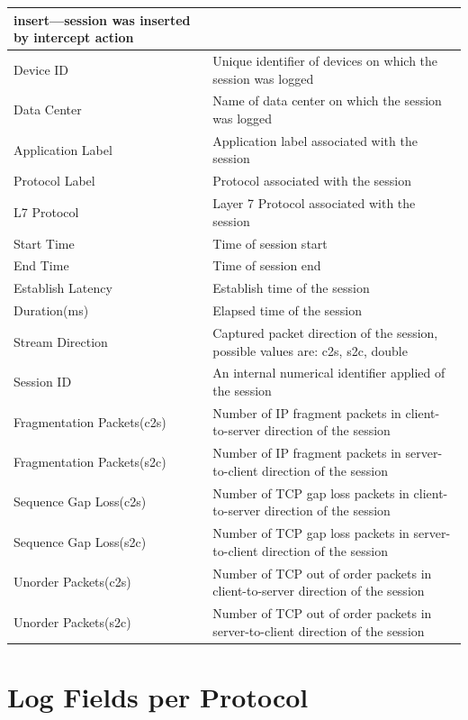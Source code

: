 \begin{longtable}{p{}|p{}}
                            insert—session was inserted by intercept action \\\hline
    Device ID &	Unique identifier of devices on which the session was logged  \\\hline
    Data Center &	Name of data center on which the session was logged \\\hline
    Application Label &	Application label associated with the session \\\hline
    Protocol Label &	Protocol associated with the session \\\hline
    L7 Protocol &	Layer 7 Protocol associated with the session \\\hline
    Start Time &	Time of session start  \\\hline
    End Time &	Time of session end \\\hline
    Establish Latency &	Establish time of the session \\\hline
    Duration(ms) &	Elapsed time of the session \\\hline
    Stream Direction &	Captured packet direction of the session, possible values are: c2s, s2c, double \\\hline
    Session ID &	An internal numerical identifier applied of the session \\\hline
    Fragmentation Packets(c2s) &	Number of IP fragment packets in client-to-server direction of the session \\\hline
    Fragmentation Packets(s2c) &	Number of IP fragment packets in server-to-client direction of the session \\\hline
    Sequence Gap Loss(c2s) &	Number of TCP gap loss packets in client-to-server direction of the session \\\hline
    Sequence Gap Loss(s2c) &	Number of TCP gap loss packets in server-to-client direction of the session \\\hline
    Unorder Packets(c2s) &	Number of TCP out of order packets in client-to-server direction of the session \\\hline
    Unorder Packets(s2c) &	Number of TCP out of order packets in server-to-client direction of the session \\\hline                                   
\end{longtable}

\section*{\hypertarget{link:Log Fields per Protocol}{Log Fields per Protocol}}
\label{sec:appendix_c:protocol}

